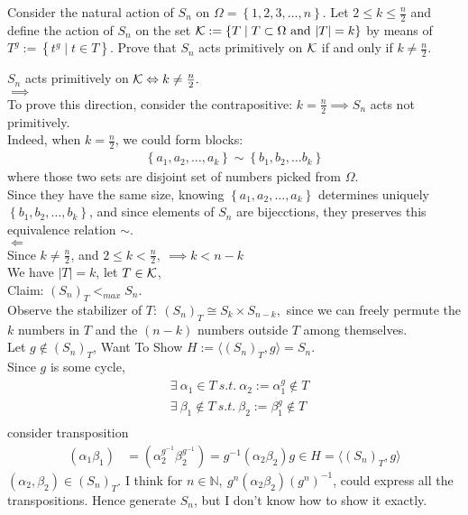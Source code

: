 \documentclass{article}
\begin{document}
\begin{homeworkProblem}
    Consider the natural action of $S_n$ on $\Omega = \left\{ 1,2,3, \ldots, n \right\}$.
    Let $2 \leq k \leq \frac{ n }{ 2 }$ and define the action of $S_n$
    on the set $\mathcal K := \left\{ T \mid T \subset \Omega \ \text{and} \ \lvert T \rvert = k \right\}$
    by means of $T^g := \left\{ t^g \mid t \in T \right\}$.
    Prove that $S_n$ acts primitively on $\mathcal K$ 
    if and only if $k \neq \frac{ n }{ 2 }$.\\
    \solution

    $S_n$ acts primitively on $\mathcal K \Leftrightarrow k \neq \frac{ n }{ 2 }.$\\
    $\implies$ \\
    To prove this direction, consider the contrapositive: 
    $k = \frac{ n }{ 2 } \implies S_n$ acts not primitively.\\
    Indeed, when $k = \frac{ n }{ 2 }$, we could form blocks:
    \begin{align}
        \left\{ a_1, a_2, \ldots, a_k \right\} \sim \left\{ b_1, b_2, \ldots b_k \right\}
    \end{align}
    where those two sets are disjoint set of numbers picked from $\Omega$.\\
    Since they have the same size, knowing $\left\{ a_1, a_2, \ldots, a_k \right\}$
    determines uniquely $\left\{ b_1, b_2, \ldots, b_k \right\}$,
    and since elements of $S_n$ are bijecctions, 
    they preserves this equivalence relation $\sim$.\\

    $\Leftarrow$\\
    Since $k \neq \frac{ n }{ 2 }$, and $2 \leq k < \frac{ n }{ 2 }, \ \implies k < n - k$ \\
    We have $\lvert T \rvert = k$, let $T \in \mathcal K$, \\
    Claim: $(S_n)_T <_{max} S_n$.\\
    Observe the stabilizer of $T: \ (S_n)_T \cong S_k \times S_{n-k},$ 
    since we can freely permute the $k$ numbers in $T$ and the
    $(n-k)$ numbers outside $T$ among themselves.\\
    Let $g \not\in (S_n)_T$, Want To Show 
    $H := \langle (S_n)_T, g \rangle = S_n$.\\
    Since $g$ is some cycle, 
    \begin{align}
        &\exists \ \alpha_1 \in T \ s.t. \ \alpha_2 := \alpha_1^{g} \not\in T\\
        &\exists \ \beta_1 \not\in T \ s.t. \ \beta_2 := \beta_1^{g} \not\in T\\
    \end{align}
    consider transposition
    \begin{align}
        (\alpha_1 \beta_1) &= (\alpha_2^{g^{-1}} \beta_2^{g^{-1}}) 
        = g^{-1}(\alpha_2 \beta_2) g \in H = \langle (S_n)_T, g \rangle
    \end{align}
    $(\alpha_2, \beta_2) \in (S_n)_T$.
    I think for $n \in \mathbb{N}, \ g^n(\alpha_2 \beta_2) (g^n)^{-1} $, 
    could express all the transpositions.
    Hence generate $S_n$, 
    but I don't know how to show it exactly.
    
    
\end{homeworkProblem}
\end{document}
